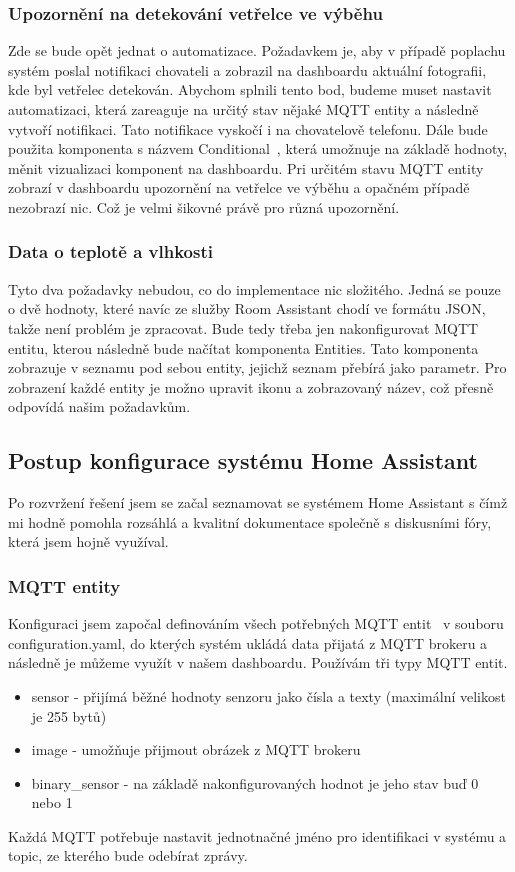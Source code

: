 \subsubsection*{Upozornění na detekování vetřelce ve výběhu}
Zde se bude opět jednat o automatizace.
Požadavkem je, aby v případě poplachu systém poslal notifikaci chovateli a zobrazil na dashboardu aktuální fotografii, kde byl vetřelec detekován.\newline
Abychom splnili tento bod, budeme muset nastavit automatizaci, která zareaguje na určitý stav nějaké MQTT entity a následně vytvoří notifikaci.
Tato notifikace vyskočí i na chovatelově telefonu.
Dále bude použita komponenta s názvem Conditional~\cite{HomeAssistantConditionalCard}, která umožnuje na základě hodnoty, měnit vizualizaci komponent na dashboardu.
Pri určitém stavu MQTT entity zobrazí v dashboardu upozornění na vetřelce ve výběhu a opačném případě nezobrazí nic.
Což je velmi šikovné právě pro různá upozornění.

\subsubsection*{Data o teplotě a vlhkosti}
Tyto dva požadavky nebudou, co do implementace nic složitého.
Jedná se pouze o dvě hodnoty, které navíc ze služby Room Assistant chodí ve formátu JSON, takže není problém je zpracovat.\newline
Bude tedy třeba jen nakonfigurovat MQTT entitu, kterou následně bude načítat komponenta Entities.
Tato komponenta zobrazuje v seznamu pod sebou entity, jejichž seznam přebírá jako parametr.
Pro zobrazení každé entity je možno upravit ikonu a zobrazovaný název, což přesně odpovídá našim požadavkům.

\subsection{Postup konfigurace systému Home Assistant}
Po rozvržení řešení jsem se začal seznamovat se systémem Home Assistant s čímž mi hodně pomohla rozsáhlá a kvalitní dokumentace společně s diskusními fóry, která jsem hojně využíval.
\subsubsection*{MQTT entity}
Konfiguraci jsem započal definováním všech potřebných MQTT entit~\cite{HomeAssistantMQTT, HomeAssistantEntities} v souboru configuration.yaml, do kterých systém ukládá data přijatá z MQTT brokeru a následně je můžeme využít v našem dashboardu.
Používám tři typy MQTT entit.
\begin{itemize}
    \item sensor - přijímá běžné hodnoty senzoru jako čísla a texty (maximální velikost je 255 bytů)
    \item image - umožňuje přijmout obrázek z MQTT brokeru
    \item binary\_sensor - na základě nakonfigurovaných hodnot je jeho stav buď 0 nebo 1
\end{itemize}
Každá MQTT potřebuje nastavit jednotnačné jméno pro identifikaci v systému a topic, ze kterého bude odebírat zprávy.

